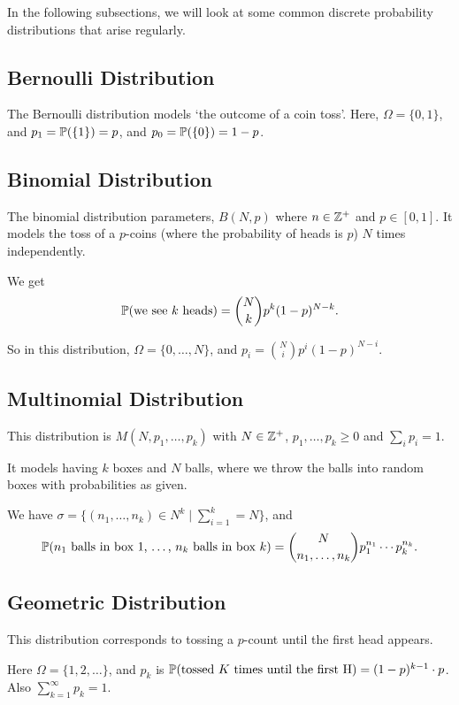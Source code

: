 \documentclass[a4paper]{scrreprt}
\begin{document}
In the following subsections, we will look at some common discrete probability distributions that arise regularly.

\subsection{Bernoulli Distribution}

The Bernoulli distribution models `the outcome of a coin toss'.
Here, $\Omega = \{0, 1\}$, and $p_1 = \mathbb{P}(\{1\}) = p$, and $p_0 = \mathbb{P}(\{0\}) = 1 - p$.

\subsection{Binomial Distribution}

The binomial distribution parameters, $B(N, p)$ where $n \in \mathbb{Z}^+$ and $p \in [0, 1]$. It models the toss of a $p$-coins (where the probability of heads is $p$) $N$ times independently.

We get
$$
	\mathbb{P}(\text{we see $k$ heads}) = \binom{N}{k}p^k (1 - p)^{N - k}.
$$

So in this distribution, $\Omega = \{0, \dots, N\}$, and $p_i = \binom{N}{i}p^i(1 - p)^{N - i}$.

\subsection{Multinomial Distribution}

This distribution is $M(N, p_1, \dots, p_k)$ with $N \in \mathbb{Z}^+$, $p_1, \dots, p_k \geq 0$ and $\sum_i p_i = 1$.

It models having $k$ boxes and $N$ balls, where we throw the balls into random boxes with probabilities as given. 

We have $\sigma = \{(n_1, \dots, n_k) \in N^k \mid \sum_{i = 1}^{k} = N\}$, and
$$
\mathbb{P}(\text{$n_1$ balls in box $1$, \dots, $n_k$ balls in box $k$}) = \binom{N}{n_1, \dots, n_k} p_1^{n_1} \cdots p_k^{n_k}.
$$

\subsection{Geometric Distribution}

This distribution corresponds to tossing a $p$-count until the first head appears. 

Here $\Omega = \{1, 2, \dots \}$, and $p_k$ is $\mathbb{P}(\text{tossed $K$ times until the first H}) = (1 - p)^{k - 1} \cdot p$. Also $\sum_{k = 1}^{\infty} p_k = 1$.
\end{document}
